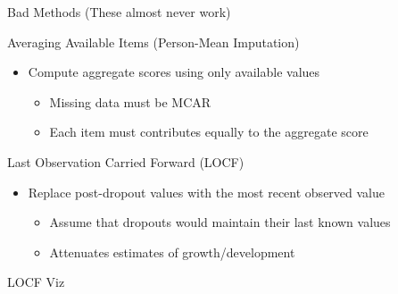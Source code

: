 \documentclass{beamer}\usepackage[]{graphicx}\usepackage[]{color}
\begin{document}

\begin{frame}{Bad Methods (These almost never work)}
  
  Averaging Available Items (Person-Mean Imputation)
  \begin{itemize}
  \item Compute aggregate scores using only available values
    \begin{itemize}
    \item Missing data must be MCAR
    \item Each item must contributes equally to the aggregate score
    \end{itemize}
  \end{itemize}
  
  \vb
  
  Last Observation Carried Forward (LOCF)
  \begin{itemize}
  \item Replace post-dropout values with the most recent observed value
    \begin{itemize}
    \item Assume that dropouts would maintain their last known values
    \item Attenuates estimates of growth/development
    \end{itemize}
  \end{itemize}
  
\end{frame}


\begin{frame}{LOCF Viz}
  
\end{frame}

\end{document}
